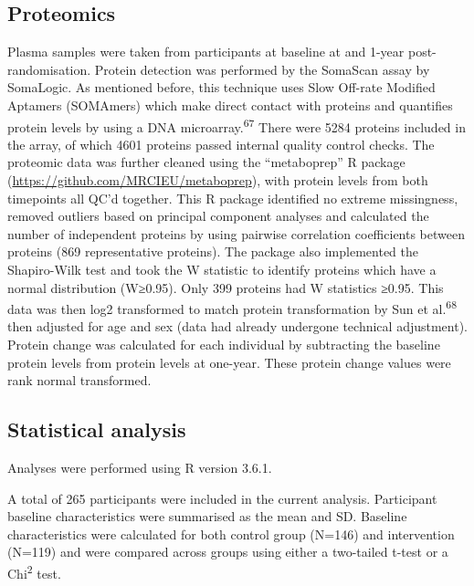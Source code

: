 \documentclass[11pt,twoside]{bristolthesis}
\begin{document}
\hypertarget{proteomics-1}{%
\subsection{Proteomics}\label{proteomics-1}}

Plasma samples were taken from participants at baseline at and 1-year post-randomisation. Protein detection was performed by the SomaScan assay by SomaLogic. As mentioned before, this technique uses Slow Off-rate Modified Aptamers (SOMAmers) which make direct contact with proteins and quantifies protein levels by using a DNA microarray.\textsuperscript{67} There were 5284 proteins included in the array, of which 4601 proteins passed internal quality control checks. The proteomic data was further cleaned using the ``metaboprep'' R package (\url{https://github.com/MRCIEU/metaboprep}), with protein levels from both timepoints all QC'd together. This R package identified no extreme missingness, removed outliers based on principal component analyses and calculated the number of independent proteins by using pairwise correlation coefficients between proteins (869 representative proteins). The package also implemented the Shapiro-Wilk test and took the W statistic to identify proteins which have a normal distribution (W≥0.95). Only 399 proteins had W statistics ≥0.95. This data was then log2 transformed to match protein transformation by Sun et al.\textsuperscript{68} then adjusted for age and sex (data had already undergone technical adjustment). Protein change was calculated for each individual by subtracting the baseline protein levels from protein levels at one-year. These protein change values were rank normal transformed.

\hypertarget{statistical-analysis-2}{%
\subsection{Statistical analysis}\label{statistical-analysis-2}}

Analyses were performed using R version 3.6.1.

A total of 265 participants were included in the current analysis. Participant baseline characteristics were summarised as the mean and SD. Baseline characteristics were calculated for both control group (N=146) and intervention (N=119) and were compared across groups using either a two-tailed t-test or a Chi\textsuperscript{2} test.
\end{document}
